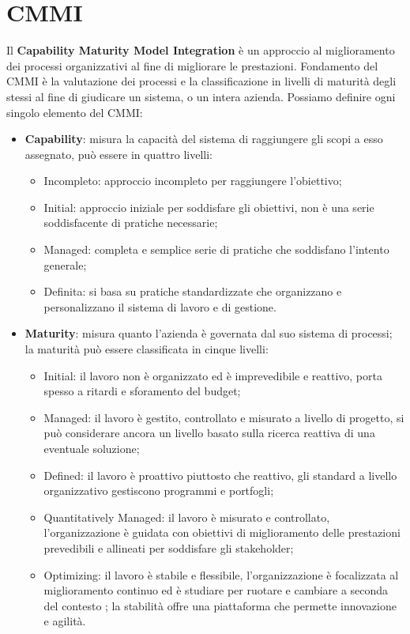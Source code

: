 \section{CMMI}
Il \textbf{Capability Maturity Model Integration} è un approccio al miglioramento dei processi organizzativi al fine di migliorare le prestazioni. Fondamento del CMMI è la valutazione dei processi e la classificazione in livelli di maturità degli stessi al fine di giudicare un sistema, o un intera azienda. Possiamo definire ogni singolo elemento del CMMI:
\begin{itemize}
	\item \textbf{Capability}: misura la capacità del sistema di raggiungere gli scopi a esso assegnato, può essere  in quattro livelli:
	\begin{itemize}
		\item Incompleto: approccio incompleto per raggiungere l'obiettivo;
		\item Initial: approccio iniziale per soddisfare gli obiettivi, non è una serie soddisfacente di pratiche necessarie;
		\item Managed: completa e semplice serie di pratiche che soddisfano l'intento generale;
		\item Definita: si basa su pratiche standardizzate che organizzano e personalizzano il sistema di lavoro e di gestione.
	\end{itemize}	 
	\item \textbf{Maturity}: misura quanto l'azienda è governata dal suo sistema di processi; la maturità può essere classificata in cinque livelli:
	\begin{itemize}
		\item Initial: il lavoro non è organizzato ed è imprevedibile e reattivo, porta spesso a ritardi e sforamento del budget;
		\item Managed: il lavoro è gestito, controllato e misurato a livello di progetto, si può considerare ancora un livello basato sulla ricerca reattiva di una eventuale soluzione;
		\item Defined: il lavoro è proattivo piuttosto che reattivo, gli standard a livello organizzativo gestiscono programmi e portfogli;
		\item Quantitatively Managed: il lavoro è misurato e controllato, l'organizzazione è guidata con obiettivi di miglioramento delle prestazioni prevedibili e allineati per soddisfare gli stakeholder;
		\item Optimizing: il lavoro è stabile e flessibile, l'organizzazione è focalizzata al miglioramento continuo ed è studiare per ruotare e cambiare a seconda del contesto ; la stabilità offre una piattaforma che permette innovazione e agilità.

\end{itemize}
\end{itemize}
